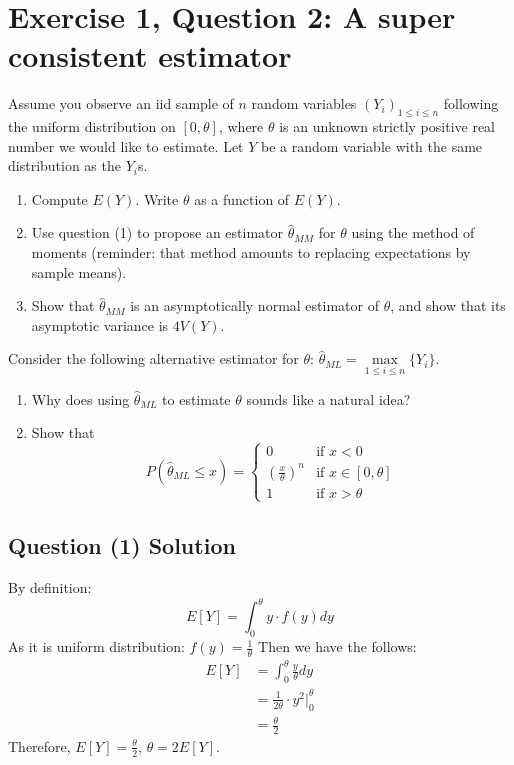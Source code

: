 \documentclass{article}
\begin{document}
\section{Exercise 1, Question 2: A super consistent estimator}

Assume you observe an iid sample of $n$ random variables $(Y_i)_{1 \leq i \leq n}$ following the uniform distribution on $[0, \theta]$, where $\theta$ is an unknown strictly positive real number we would like to estimate. Let $Y$ be a random variable with the same distribution as the $Y_i$s.

\begin{enumerate}[label=(\arabic*), leftmargin=*, align=left]
    \item Compute $E(Y)$. Write $\theta$ as a function of $E(Y)$.
    \item Use question  (1) to propose an estimator $\hat{\theta}_{MM}$ for $\theta$ using the method of moments (reminder: that method amounts to replacing expectations by sample means).
    \item Show that $\hat{\theta}_{MM}$ is an asymptotically normal estimator of $\theta$, and show that its asymptotic variance is $4V(Y)$.
\end{enumerate}

\noindent Consider the following alternative estimator for $\theta$: $\hat{\theta}_{ML} = \max\limits_{1 \leq i \leq n} \{ Y_i \}$.

\begin{enumerate}[label=(\arabic*), start=4, leftmargin=*, align=left]
    \item Why does using $\hat{\theta}_{ML}$ to estimate $\theta$ sounds like a natural idea?
    \item Show that
    \[
    P(\hat{\theta}_{ML} \leq x) = \left\{
    \begin{array}{ll}
    0 & \text{if } x < 0 \\
    \left( \frac{x}{\theta} \right)^n & \text{if } x \in [0, \theta] \\
    1 & \text{if } x > \theta
    \end{array}
    \right.
    \]
\end{enumerate}
\subsection{Question (1) Solution}
By definition:
$$E[Y] = \int^{\theta}_{0}y\cdot f(y)dy$$
As it is uniform distribution: $f(y) = \frac{1}{\theta}$
Then we have the follows:
\begin{align*}
E[Y] &= \int^{\theta}_{0}\frac{y}{\theta}dy
\\&= \frac{1}{2\theta}\cdot y^2|^{\theta}_0
\\&=\frac{\theta}{2}
\end{align*}
Therefore, $E[Y] = \frac{\theta}{2}$, $\theta = 2E[Y]$.
\end{document}
